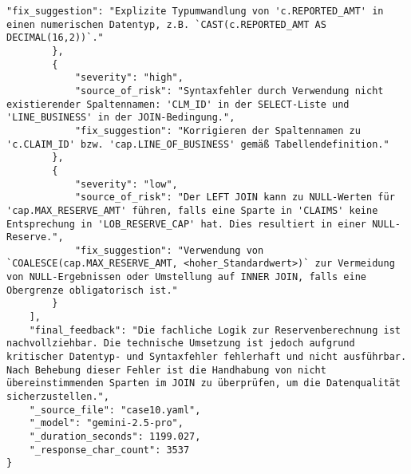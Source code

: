 \begin{lstlisting}[caption={Ausgabe: GEMINI 2.5 Pro Anwendungsfall 10 Hauptdurchlauf},label={gemini_case10_prompt1}]
            "fix_suggestion": "Explizite Typumwandlung von 'c.REPORTED_AMT' in einen numerischen Datentyp, z.B. `CAST(c.REPORTED_AMT AS DECIMAL(16,2))`."
        },
        {
            "severity": "high",
            "source_of_risk": "Syntaxfehler durch Verwendung nicht existierender Spaltennamen: 'CLM_ID' in der SELECT-Liste und 'LINE_BUSINESS' in der JOIN-Bedingung.",
            "fix_suggestion": "Korrigieren der Spaltennamen zu 'c.CLAIM_ID' bzw. 'cap.LINE_OF_BUSINESS' gemäß Tabellendefinition."
        },
        {
            "severity": "low",
            "source_of_risk": "Der LEFT JOIN kann zu NULL-Werten für 'cap.MAX_RESERVE_AMT' führen, falls eine Sparte in 'CLAIMS' keine Entsprechung in 'LOB_RESERVE_CAP' hat. Dies resultiert in einer NULL-Reserve.",
            "fix_suggestion": "Verwendung von `COALESCE(cap.MAX_RESERVE_AMT, <hoher_Standardwert>)` zur Vermeidung von NULL-Ergebnissen oder Umstellung auf INNER JOIN, falls eine Obergrenze obligatorisch ist."
        }
    ],
    "final_feedback": "Die fachliche Logik zur Reservenberechnung ist nachvollziehbar. Die technische Umsetzung ist jedoch aufgrund kritischer Datentyp- und Syntaxfehler fehlerhaft und nicht ausführbar. Nach Behebung dieser Fehler ist die Handhabung von nicht übereinstimmenden Sparten im JOIN zu überprüfen, um die Datenqualität sicherzustellen.",
    "_source_file": "case10.yaml",
    "_model": "gemini-2.5-pro",
    "_duration_seconds": 1199.027,
    "_response_char_count": 3537
}
\end{lstlisting}

